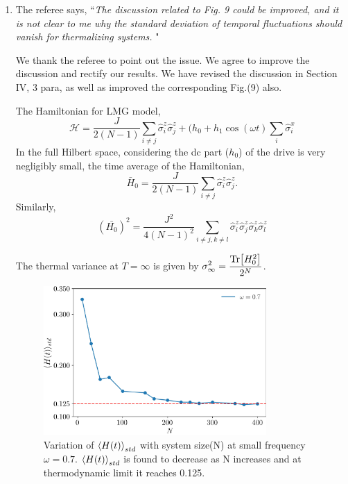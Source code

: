 \documentclass[aps,prb,reprint,showpacs,floatfix,superscriptaddress, onecolumn, nofootinbib, 9pt]{revtex4-2}
\newcommand{\response}[1]{{\color{blue}#1}} %
\begin{document}
\begin{enumerate}
		\item The referee says, ``\textit{The discussion related to Fig. 9 could be improved, and it is not clear to me why the standard deviation of temporal fluctuations should vanish for thermalizing systems. }"\\
		
		\response{ We thank the referee to point out the issue. We agree to improve the discussion and rectify our results. We have revised the discussion in Section IV, 3 para, as well as improved the corresponding Fig.(9) also.
			
			
			The Hamiltonian for LMG model,
			\begin{equation}
				\mathcal{H} = \frac{J}{2(N-1)}\sum_{i\neq j}\hat{\sigma}^z_i \hat{\sigma}^z_j + (h_0 +h_1 \cos(\omega t) \sum_i \hat{\sigma}^x_i
			\end{equation}
			In the full Hilbert space, considering the dc part ($h_0$) of the drive is very negligibly small, the time average of the Hamiltonian,
			\begin{equation*}
				\bar{H}_0 = \frac{J}{2(N-1)}\sum_{i\neq j}\hat{\sigma}^z_i \hat{\sigma}^z_j.
			\end{equation*}
			Similarly,
			\begin{equation}
				\left(\bar{H_0}\right)^2 = \frac{J^2}{4(N-1)^2}\sum_{i\neq j, k \neq l} \hat{\sigma}^z_i \hat{\sigma}^z_j \hat{\sigma}^z_k \hat{\sigma}^z_l
			\end{equation}
			
			The thermal variance at $T= \infty$ is given by $\displaystyle \sigma^2_{\infty} = \frac{\Tr[H^2_0]}{2^N}$. 
			
			\begin{figure}[h!]
				\includegraphics[width=8.5cm]{hbar_avg_std_w0.7.jpg}
				\caption{Variation of $\expval{H(t)}_{std}$ with system size(N) at small frequency $\omega=0.7$. $\expval{H(t)}_{std}$ is found to decrease as N increases and at thermodynamic limit it reaches 0.125.}
				\label{fig:std_Ns}
			\end{figure}
			
}
\end{enumerate}
\end{document}
